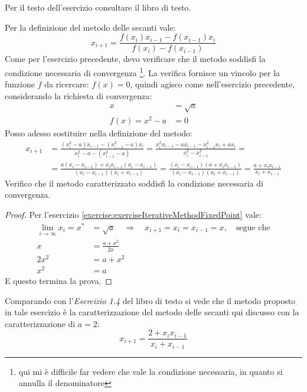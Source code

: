 \begin{exercise}[2.3]
Per il testo dell'esercizio consultare il libro di testo.
\end{exercise}
Per la definizione del metodo delle secanti vale:
\begin{displaymath}
	x_{i + 1} = \frac{f(x_{i})x_{i-1} - f(x_{i-1})x_{i}}{f(x_{i}) - f(x_{i-1})}
\end{displaymath}
Come per l'esercizio precedente, devo verificare che il metodo soddisfi la
condizione necessaria di convergenza \footnote{qui mi \`e difficile far vedere
che vale la condizione necessaria, in quanto si annulla il denominatore}.
La verifica fornisce un vincolo per la funzione $f$ da ricercare: $f(x) = 0$, 
quindi agisco come nell'esercizio precedente, considerando la richiesta di
convergenza:
\begin{equation}
\begin{split}
	x &= \sqrt{a} \\
	f(x) = x^{2} - a &= 0
\end{split}
\end{equation}
Posso adesso sostituire nella definizione del metodo:
\begin{displaymath}
\begin{split}
	x_{i + 1} &= \frac{(x_{i}^{2} - a)x_{i-1} - (x_{i-1}^{2} - a)x_{i}}
		{x_{i}^{2} - a - (x_{i-1}^{2} - a)}
			  = \frac{x_{i}^{2} x_{i-1} - a x_{i-1} - 
						x_{i-1}^{2} x_{i} + a x_{i}}
					{x_{i}^{2} - x_{i-1}^{2}} = \\
			  &= \frac{a(x_{i} - x_{i-1}) + x_{i}x_{i-1}(x_{i} - x_{i-1})}
					{(x_{i} - x_{i-1})(x_{i} + x_{i-1})} 
			  = \frac{(x_{i} - x_{i-1})(a + x_{i}x_{i-1})}
					{(x_{i} - x_{i-1})(x_{i} + x_{i-1})} 
			  = \frac{a + x_{i}x_{i-1}}{x_{i} + x_{i-1}}
\end{split}
\end{displaymath}
Verifico che il metodo caratterizzato soddisfi la condizione necessaria di
convergenza.
\begin{proof}
Per l'esercizio \ref{exercise:exerciseIterativeMethodFixedPoint} vale:
\begin{displaymath}
\begin{split}
\lim_{i\rightarrow\infty}{x_{i}} = x^{*} & = \sqrt{a} \quad\Rightarrow \quad
x_{i+1} = x_{i} = x_{i-1} = x, \quad \text{segue che} \\
x &= \frac{a + x^{2}}{2x} \\ 
2x^{2} &= a + x^{2} \\
x^{2} &= a
\end{split}
\end{displaymath}
E questo termina la prova.
\end{proof}
Comparando con l'\emph{Esercizio 1.4} del libro di testo si vede che il metodo
proposto in tale esercizio \`e la caratterizzazione del metodo delle secanti 
qui discusso con la caratterizzazione di $a = 2$:
\begin{displaymath}
x_{i + 1} = \frac{2 + x_{i}x_{i-1}}{x_{i} + x_{i-1}}
\end{displaymath}

